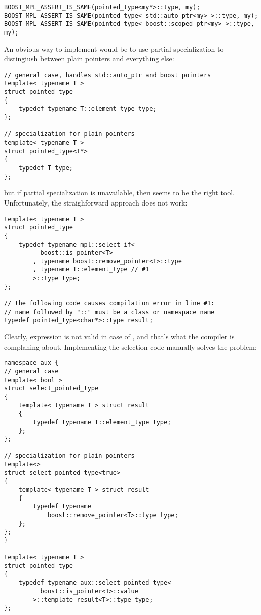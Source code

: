 \documentclass{netobjectdays}
\begin{document}
{\footnotesize
\begin{verbatim}
BOOST_MPL_ASSERT_IS_SAME(pointed_type<my*>::type, my);
BOOST_MPL_ASSERT_IS_SAME(pointed_type< std::auto_ptr<my> >::type, my);
BOOST_MPL_ASSERT_IS_SAME(pointed_type< boost::scoped_ptr<my> >::type, my);
\end{verbatim}
}

An obvious way to implement  would be to 
use partial specialization to distingiush between plain 
pointers and everything else:

{\footnotesize
\begin{verbatim}
// general case, handles std::auto_ptr and boost pointers
template< typename T >
struct pointed_type
{
    typedef typename T::element_type type;
};

// specialization for plain pointers
template< typename T >
struct pointed_type<T*>
{
    typedef T type;
};
\end{verbatim}
}

but if partial specialization is unavailable, then 
 seems to be the right tool. Unfortunately,
the straighforward approach does not work:

{\footnotesize
\begin{verbatim}
template< typename T >
struct pointed_type
{
    typedef typename mpl::select_if<
          boost::is_pointer<T>
        , typename boost::remove_pointer<T>::type
        , typename T::element_type // #1
        >::type type;
};

// the following code causes compilation error in line #1:
// name followed by "::" must be a class or namespace name
typedef pointed_type<char*>::type result;
\end{verbatim}
}

Clearly,  expression is not 
valid in case of , and that's what the 
compiler is complaning about. Implementing the selection code 
manually solves the problem: 

{\footnotesize
\begin{verbatim}
namespace aux {
// general case
template< bool >
struct select_pointed_type
{
    template< typename T > struct result
    {
        typedef typename T::element_type type;
    };
};

// specialization for plain pointers
template<>
struct select_pointed_type<true>
{
    template< typename T > struct result
    {
        typedef typename
            boost::remove_pointer<T>::type type;
    };
};
}

template< typename T >
struct pointed_type
{
    typedef typename aux::select_pointed_type<
          boost::is_pointer<T>::value
        >::template result<T>::type type;
};
\end{verbatim}
}
\end{document}
